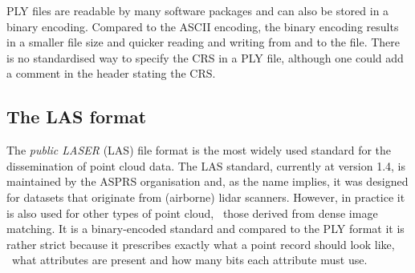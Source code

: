 %

PLY files are readable by many software packages and can also be stored in a binary encoding.
Compared to the ASCII encoding, the binary encoding results in a smaller file size and quicker reading and writing from and to the file.
There is no standardised way to specify the CRS in a PLY file, although one could add a comment in the header stating the CRS\@.


\subsection{The LAS format}%

The \emph{public LASER} (LAS) file format is the most widely used standard for the dissemination of point cloud data.
The LAS standard, currently at version 1.4, is maintained by the ASPRS organisation and, as the name implies, it was designed for datasets that originate from (airborne) lidar scanners.
However, in practice it is also used for other types of point cloud, \eg\ those derived from dense image matching.
It is a binary-encoded standard and compared to the PLY format it is rather strict because it prescribes exactly what a point record should look like, \ie\ what attributes are present and how many bits each attribute must use. 

